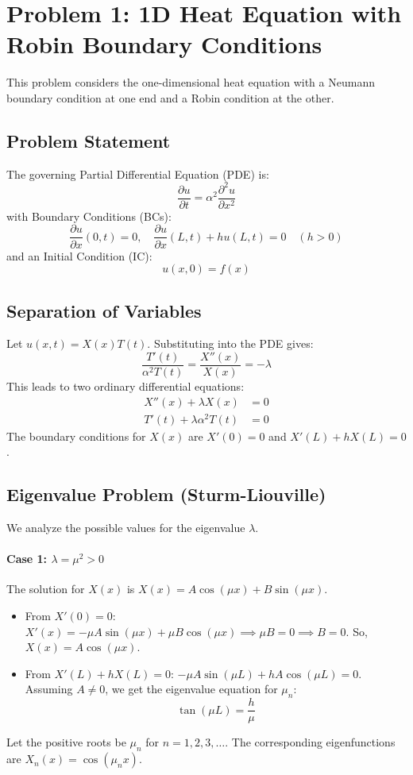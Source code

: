 \documentclass{article}
\begin{document}
	\section*{Problem 1: 1D Heat Equation with Robin Boundary Conditions}
	
	This problem considers the one-dimensional heat equation with a Neumann boundary condition at one end and a Robin condition at the other.
	
	\subsection*{Problem Statement}
	The governing Partial Differential Equation (PDE) is:
	$$
	\frac{\partial u}{\partial t} = \alpha^2 \frac{\partial^2 u}{\partial x^2}
	$$
	with Boundary Conditions (BCs):
	$$
	\frac{\partial u}{\partial x}(0, t) = 0, \quad \frac{\partial u}{\partial x}(L, t) + h u(L, t) = 0 \quad (h > 0)
	$$
	and an Initial Condition (IC):
	$$
	u(x, 0) = f(x)
	$$
	
	\subsection*{Separation of Variables}
	Let $u(x,t) = X(x)T(t)$. Substituting into the PDE gives:
	$$
	\frac{T'(t)}{\alpha^2 T(t)} = \frac{X''(x)}{X(x)} = -\lambda
	$$
	This leads to two ordinary differential equations:
	\begin{align*}
		X''(x) + \lambda X(x) &= 0 \\
		T'(t) + \lambda \alpha^2 T(t) &= 0
	\end{align*}
	The boundary conditions for $X(x)$ are $X'(0) = 0$ and $X'(L) + hX(L) = 0$.
	
	\subsection*{Eigenvalue Problem (Sturm-Liouville)}
	
	We analyze the possible values for the eigenvalue $\lambda$.
	
	\paragraph{Case 1: $\lambda = \mu^2 > 0$}
	The solution for $X(x)$ is $X(x) = A\cos(\mu x) + B\sin(\mu x)$.
	\begin{itemize}
		\item From $X'(0)=0$: $X'(x) = -\mu A\sin(\mu x) + \mu B\cos(\mu x) \implies \mu B = 0 \implies B=0$.
		So, $X(x) = A\cos(\mu x)$.
		\item From $X'(L)+hX(L)=0$: $-\mu A\sin(\mu L) + hA\cos(\mu L) = 0$.
		Assuming $A \neq 0$, we get the eigenvalue equation for $\mu_n$:
		$$
		\tan(\mu L) = \frac{h}{\mu}
		$$
	\end{itemize}
	Let the positive roots be $\mu_n$ for $n=1, 2, 3, \dots$. The corresponding eigenfunctions are $X_n(x) = \cos(\mu_n x)$.
	
\end{document}
